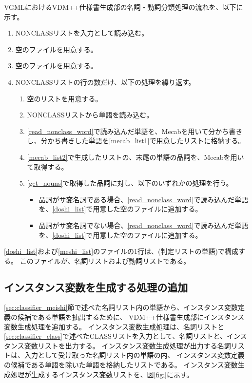 VGMLにおけるVDM++仕様書生成部の名詞・動詞分類処理の流れを、以下に示す。

\begin{enumerate}
    \item NONCLASSリストを入力として読み込む。
    \item 空のファイルを用意する。
    \label{doshi_list}
    \item 空のファイルを用意する。
    \label{meshi_list}
    \item NONCLASSリストの行の数だけ、以下の処理を繰り返す。
        \begin{enumerate}
            \item 空のリストを用意する。
            \label{mecab_list1}
            \item NONCLASSリストから単語を読み込む。
            \label{read_nonclass_word}
            \item \ref{read_nonclass_word}で読み込んだ単語を、Mecabを用いて分かち書きし、分かち書きした単語を\ref{mecab_list1}で用意したリストに格納する。
            \label{mecab_list2}
            \item \ref{mecab_list2}で生成したリストの、末尾の単語の品詞を、Mecabを用いて取得する。
            \label{get_nouns}
            \item \ref{get_nouns}で取得した品詞に対し、以下のいずれかの処理を行う。
                \begin{itemize}
                    \item 品詞がサ変名詞である場合、\ref{read_nonclass_word}で読み込んだ単語を、\ref{doshi_list}で用意した空のファイルに追加する。
                    \item 品詞がサ変名詞でない場合、\ref{read_nonclass_word}で読み込んだ単語を、\ref{doshi_list}で用意した空のファイルに追加する。
                \end{itemize}
        \end{enumerate}
\end{enumerate}

\ref{doshi_list}および\ref{meshi_list}のファイルの1行は、(判定リストの単語)で構成する。
このファイルが、名詞リストおよび動詞リストである。

\subsection{インスタンス変数を生成する処理の追加}
\ref{sec:classifier_meishi}節で述べた名詞リスト内の単語から、インスタンス変数定義の候補である単語を抽出するために、
VDM++仕様書生成部にインスタンス変数生成処理を追加する。
インスタンス変数生成処理は、名詞リストと\ref{sec:classifier_class}で述べたCLASSリストを入力として、名詞リストと、インスタンス変数リストを出力する。
インスタンス変数生成処理が出力する名詞リストは、入力として受け取った名詞リスト内の単語の内、
インスタンス変数定義の候補である単語を除いた単語を格納したリストである。
インスタンス変数生成処理が生成するインスタンス変数リストを、図\ref{fig:}に示す。

